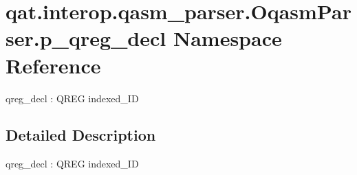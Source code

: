 \hypertarget{namespaceqat_1_1interop_1_1qasm__parser_1_1OqasmParser_1_1p__qreg__decl}{\section{qat.\-interop.\-qasm\-\_\-parser.\-Oqasm\-Parser.\-p\-\_\-qreg\-\_\-decl Namespace Reference}
\label{namespaceqat_1_1interop_1_1qasm__parser_1_1OqasmParser_1_1p__qreg__decl}
}


qreg\-\_\-decl \-: Q\-R\-E\-G indexed\-\_\-\-I\-D  




\subsection{Detailed Description}
qreg\-\_\-decl \-: Q\-R\-E\-G indexed\-\_\-\-I\-D 